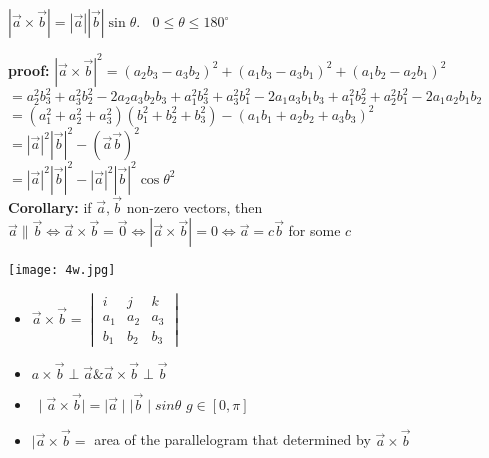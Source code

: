 \begin{theorem}
$|\overrightarrow{a}\times\overrightarrow{b}|=|\overrightarrow{a}||\overrightarrow{b}|\sin{\theta}.~~~~0\leq\theta\leq180^\circ$\\
\end{theorem}
{\color{smalt(darkpowderblue)}\textbf{proof:}}
$|\overrightarrow{a}\times\overrightarrow{b}|^2=(a_2b_3-a_3b_2)^2+(a_1b_3-a_3b_1)^2+(a_1b_2-a_2b_1)^2$\\
$=a_2^2b_3^2+a_3^2b_2^2-2a_2a_3b_2b_3+a_1^2b_3^2+a_3^2b_1^2-2a_1a_3b_1b_3+a_1^2b_2^2+a_2^2b_1^2-2a_1a_2b_1b_2$\\
$=(a_1^2+a_2^2+a_3^2)(b_1^2+b_2^2+b_3^2)-(a_1b_1+a_2b_2+a_3b_3)^2$\\
$=|\overrightarrow{a}|^2|\overrightarrow{b}|^2-(\overrightarrow{a}\overrightarrow{b})^2$\\
$=|\overrightarrow{a}|^2|\overrightarrow{b}|^2-|\overrightarrow{a}|^2|\overrightarrow{b}|^2\cos\theta^2$\\
\noindent{\color{smalt(darkpowderblue)}\rule{\linewidth}{.2mm}}
{\color{smalt(darkpowderblue)}\textbf{Corollary:}}
if $\overrightarrow{a},\overrightarrow{b}$ non-zero vectors, then\\
$\overrightarrow{a}\parallel\overrightarrow{b}\iff \overrightarrow{a}\times\overrightarrow{b}=\overrightarrow{0}\iff 
|\overrightarrow{a}\times\overrightarrow{b}|=0\iff\overrightarrow{a}=c\overrightarrow{b}$ for some $c$\\
\begin{center}
    \texttt{[image: 4w.jpg]}
\end{center}
\begin{itemize}
\item $ {\overrightarrow{a}}\times{\overrightarrow{b}} =
\begin{vmatrix}
{i} & {j} & {k} \\
a_{1} & a_{2} & a_{3} \\
b_{1} & b_{2} & b_{3} 
\end{vmatrix}$
\item $a \times {\overrightarrow{b}} \perp {\overrightarrow{a}} \& {\overrightarrow{a}} \times {\overrightarrow{b}} \perp {\overrightarrow{b}}$
\item $\ \mid{\overrightarrow{a}}\times{\overrightarrow{b}}\mid = \mid{\overrightarrow{a}}\mid  \mid{\overrightarrow{b}}\mid sin \theta$ \hspace{2cm} $g \in [0,\pi ]$
\item $ \mid{\overrightarrow{a}}\times{\overrightarrow{b}} =$ area of the parallelogram that determined by ${\overrightarrow{a}}\times{\overrightarrow{b}}$ 
\end{itemize}
